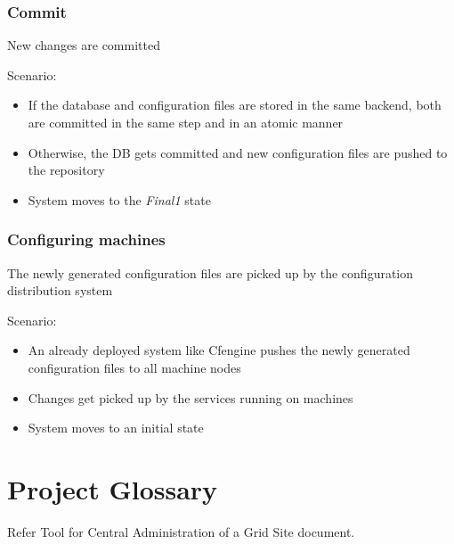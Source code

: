 \documentclass[12pt]{article}
\begin{document}
\subsubsection{Commit}
New changes are committed

Scenario:
\begin{itemize}
    \item{If the database and configuration files are stored in the same
        backend, both are committed in the same step and in an atomic manner}
    \item{Otherwise, the DB gets committed and new configuration files are
        pushed to the repository}
    \item{System moves to the {\em Final1} state}
\end{itemize}

\subsubsection{Configuring machines}
The newly generated configuration files are picked up by the configuration
distribution system

Scenario:
\begin{itemize}
    \item{An already deployed system like Cfengine pushes the newly generated
        configuration files to all machine nodes}
    \item{Changes get picked up by the services running on machines}
    \item{System moves to an initial state}
\end{itemize}


\section{Project Glossary}

Refer Tool for Central Administration of a Grid Site document.
\end{document}
